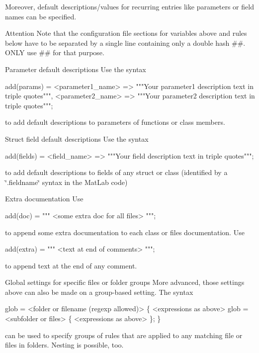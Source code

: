 Moreover, default descriptions/values for recurring entries like parameters or field names can be specified.

\begin{DoxyAttention}{Attention}
Note that the configuration file sections for variables above and rules below have to be separated by a single line containing only a double hash \textquotesingle{}\#\#\textquotesingle{}. O\+N\+L\+Y use \textquotesingle{}\#\#\textquotesingle{} for that purpose.
\end{DoxyAttention}
\begin{DoxyParagraph}{Parameter default descriptions}
Use the syntax 
\begin{DoxyCode}
add(params) =     <parameter1\_name> => \textcolor{stringliteral}{""}\textcolor{stringliteral}{"Your parameter1 description text in triple quotes"}\textcolor{stringliteral}{""},
       <parameter2\_name> => \textcolor{stringliteral}{""}\textcolor{stringliteral}{"Your parameter2 description text in triple quotes"}\textcolor{stringliteral}{""}; 
\end{DoxyCode}
 to add default descriptions to parameters of functions or class members.
\end{DoxyParagraph}
\begin{DoxyParagraph}{Struct field default descriptions}
Use the syntax 
\begin{DoxyCode}
add(fields) = <field\_name> => \textcolor{stringliteral}{""}\textcolor{stringliteral}{"Your field description text in triple quotes"}\textcolor{stringliteral}{""}; 
\end{DoxyCode}
 to add default descriptions to fields of any struct or class (identified by a \char`\"{}.\+fieldname\char`\"{} syntax in the Mat\+Lab code)
\end{DoxyParagraph}
\begin{DoxyParagraph}{Extra documentation}
Use 
\begin{DoxyCode}
add(doc) = \textcolor{stringliteral}{""}\textcolor{stringliteral}{" <some extra doc for all files> "}\textcolor{stringliteral}{""}; 
\end{DoxyCode}
 to append some extra documentation to each class or files documentation. Use 
\begin{DoxyCode}
add(extra) = \textcolor{stringliteral}{""}\textcolor{stringliteral}{" <text at end of comments> "}\textcolor{stringliteral}{""}; 
\end{DoxyCode}
 to append text at the end of any comment.
\end{DoxyParagraph}
\begin{DoxyParagraph}{Global settings for specific files or folder groups}
More advanced, those settings above can also be made on a group-\/based setting. The syntax 
\begin{DoxyCode}
glob = <folder or filename (regexp allowed)> \{
   <expressions as above>
   glob = <subfolder or files> \{
       <expressions as above>
   \};
\}
\end{DoxyCode}
 can be used to specify groups of rules that are applied to any matching file or files in folders. Nesting is possible, too.
\end{DoxyParagraph}
